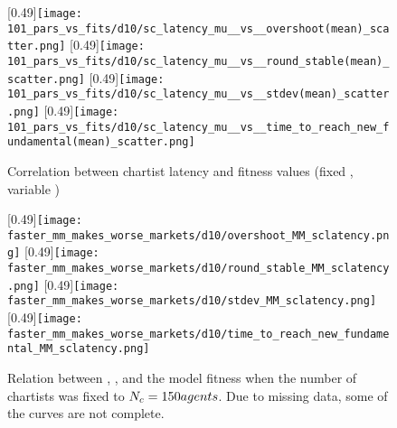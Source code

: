 \begin{figure}
	\centering
	[0.49\linewidth]{\texttt{[image: 101\_pars\_vs\_fits/d10/sc\_latency\_mu\_\_vs\_\_overshoot(mean)\_scatter.png]}}
	[0.49\linewidth]{\texttt{[image: 101\_pars\_vs\_fits/d10/sc\_latency\_mu\_\_vs\_\_round\_stable(mean)\_scatter.png]}}
	\vspace{0.5cm}
	[0.49\linewidth]{\texttt{[image: 101\_pars\_vs\_fits/d10/sc\_latency\_mu\_\_vs\_\_stdev(mean)\_scatter.png]}}
	[0.49\linewidth]{\texttt{[image: 101\_pars\_vs\_fits/d10/sc\_latency\_mu\_\_vs\_\_time\_to\_reach\_new\_fundamental(mean)\_scatter.png]}}
	\caption{Correlation between chartist latency and fitness values (fixed \scnAgents, variable \ssmmnAgents)}
	\label{fig:d10_parvfit_sclatencymu}
\end{figure}

\begin{figure}
	\centering
	\subcaptionbox{\label{fig:faster_mm_makes_worse_markets/d10/overshoot_MM_sclatency}}
	[0.49\linewidth]{\texttt{[image: faster\_mm\_makes\_worse\_markets/d10/overshoot\_MM\_sclatency.png]}}
	\subcaptionbox{\label{fig:faster_mm_makes_worse_markets/d10/round_stable_MM_sclatency}}
	[0.49\linewidth]{\texttt{[image: faster\_mm\_makes\_worse\_markets/d10/round\_stable\_MM\_sclatency.png]}}
	\vspace{0.5cm}
	\subcaptionbox{\label{fig:faster_mm_makes_worse_markets/d10/stdev_MM_sclatency}}
	[0.49\linewidth]{\texttt{[image: faster\_mm\_makes\_worse\_markets/d10/stdev\_MM\_sclatency.png]}}
	\subcaptionbox{\label{fig:faster_mm_makes_worse_markets/d10/time_to_reach_new_fundamental_MM_sclatency}}
	[0.49\linewidth]{\texttt{[image: faster\_mm\_makes\_worse\_markets/d10/time\_to\_reach\_new\_fundamental\_MM\_sclatency.png]}}
	\caption{Relation between \ssmmnAgents, \sclatencymu, and the model fitness when the number of chartists was fixed to $N_{c} = 150 agents$. Due to missing data, some of the curves are not complete.}
	\label{fig:faster_mm_makes_worse_markets/d10/MM_sclatency}
\end{figure}




